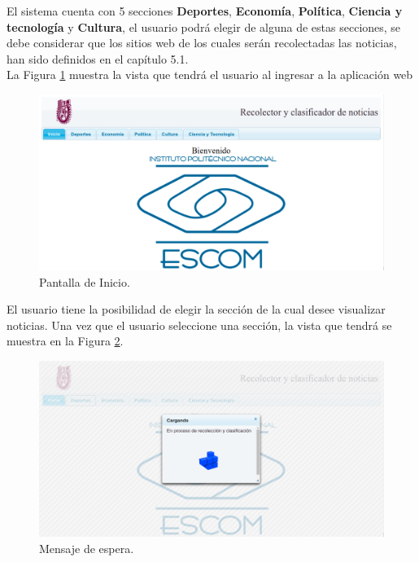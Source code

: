 El sistema cuenta con 5 secciones \textbf{Deportes}, \textbf{Economía}, \textbf{Política}, \textbf{Ciencia y tecnología} y \textbf{Cultura}, el usuario podrá elegir de alguna de estas secciones, se debe considerar que los sitios web de los cuales serán recolectadas las noticias, han sido definidos en el capítulo 5.1.\\
La Figura \ref{fig:PantallaInicio} muestra la vista que tendrá el usuario al ingresar a la aplicación web
\\
\begin{figure}[H]
\centering
\includegraphics[scale=0.29]{imagenes/Capitulo5/pantallaPrincipal.png}
\caption{Pantalla de Inicio.}
\label{fig:PantallaInicio}
\end{figure}

El usuario tiene la posibilidad de elegir la sección de la cual desee visualizar noticias. Una vez que el usuario seleccione una sección, la vista que tendrá se muestra en la Figura \ref{fig:loading}.
\\
\begin{figure}[H]
\centering
\includegraphics[scale=0.29]{imagenes/Capitulo5/mensajeEspera.png}
\caption{Mensaje de espera.}
\label{fig:loading}
\end{figure}

